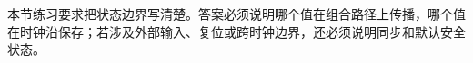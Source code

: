本节练习要求把状态边界写清楚。答案必须说明哪个值在组合路径上传播，哪个值在时钟沿保存；若涉及外部输入、复位或跨时钟边界，还必须说明同步和默认安全状态。













































































